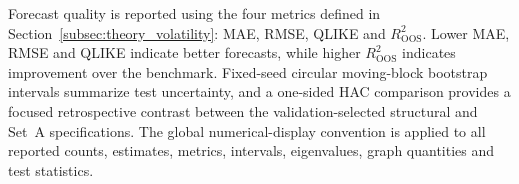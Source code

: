 Forecast quality is reported using the four metrics defined in Section~\ref{subsec:theory_volatility}: MAE, RMSE, QLIKE and $R^2_{\mathrm{OOS}}$. Lower MAE, RMSE and QLIKE indicate better forecasts, while higher $R^2_{\mathrm{OOS}}$ indicates improvement over the benchmark. Fixed-seed circular moving-block bootstrap intervals summarize test uncertainty, and a one-sided HAC comparison provides a focused retrospective contrast between the validation-selected structural and Set~A specifications. The global numerical-display convention is applied to all reported counts, estimates, metrics, intervals, eigenvalues, graph quantities and test statistics.
